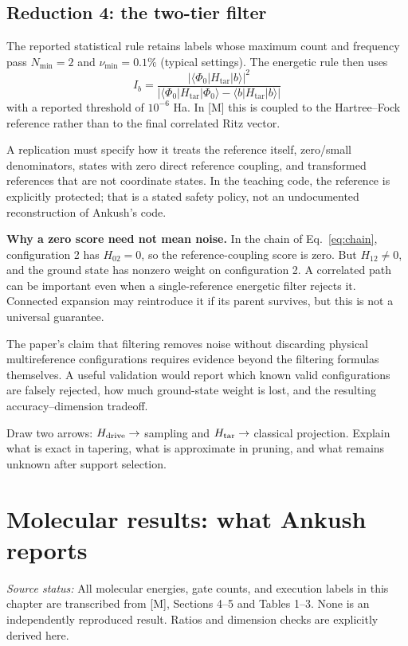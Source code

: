 \documentclass[11pt,a4paper,oneside]{report}
\newcommand{\ket}[1]{\lvert #1\rangle}
\newcommand{\bra}[1]{\langle #1\rvert}
\newcommand{\Ht}{H_{\mathrm{tar}}}
\newcommand{\src}[1]{\par{\small\color{grey}\textit{Source status:} #1}\par}
\newcommand{\checkpoint}[1]{\begin{idea}[Check your understanding]#1\end{idea}}
\begin{document}
\section{Reduction 4: the two-tier filter}
The reported statistical rule retains labels whose maximum count and frequency pass $N_{\min}=2$ and $\nu_{\min}=0.1\%$ (typical settings). The energetic rule then uses
\begin{equation}\label{eq:energyfilter}
I_b=\frac{|\bra{\Phi_0}\Ht\ket b|^2}
{|\bra{\Phi_0}\Ht\ket{\Phi_0}-\bra b\Ht\ket b|}
\end{equation}
with a reported threshold of $10^{-6}$ Ha. In [M] this is coupled to the Hartree--Fock reference rather than to the final correlated Ritz vector.

A replication must specify how it treats the reference itself, zero/small denominators, states with zero direct reference coupling, and transformed references that are not coordinate states. In the teaching code, the reference is explicitly protected; that is a stated safety policy, not an undocumented reconstruction of Ankush's code.

\textbf{Why a zero score need not mean noise.} In the chain of Eq.~\eqref{eq:chain}, configuration 2 has $H_{02}=0$, so the reference-coupling score is zero. But $H_{12}\ne0$, and the ground state has nonzero weight on configuration 2. A correlated path can be important even when a single-reference energetic filter rejects it. Connected expansion may reintroduce it if its parent survives, but this is not a universal guarantee.

The paper's claim that filtering removes noise without discarding physical multireference configurations requires evidence beyond the filtering formulas themselves. A useful validation would report which known valid configurations are falsely rejected, how much ground-state weight is lost, and the resulting accuracy--dimension tradeoff.

\checkpoint{Draw two arrows: $H_{\rm drive}\to$ sampling and $H_{\rm tar}\to$ classical projection. Explain what is exact in tapering, what is approximate in pruning, and what remains unknown after support selection.}

\chapter{Molecular results: what Ankush reports}\label{ch:results}
\src{All molecular energies, gate counts, and execution labels in this chapter are transcribed from [M], Sections 4--5 and Tables 1--3. None is an independently reproduced result. Ratios and dimension checks are explicitly derived here.}
\end{document}
